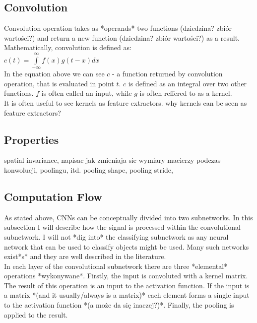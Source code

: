 \documentclass[a4paper,10pt]{report}
\begin{document}
      \subsection{Convolution} %
	Convolution operation takes as *operands* two functions (dziedzina? zbiór wartości?) and return a new function (dziedzina? zbiór wartości?) as a result. Mathematically, convolution is defined as: \\
	
	$c(t) = \int\limits_{-\infty}^\infty f(x)g(t-x)dx$ \\
	
	In the equation above we can see $c$ - a function returned by convolution operation, that is evaluated in point $t$. $c$ is defined as an integral over two other functions. $f$ is often called an input, while $g$ is often reffered to as a kernel.%
	  \\
	
	
	It is often useful to see kernels as feature extractors. 
	why kernels can be seen as feature extractors?

      \subsection{Properties} %
	spatial invariance, napisac jak zmieniaja sie wymiary macierzy podczas konwolucji, poolingu, itd. pooling shape, pooling stride,
      \subsection{Computation Flow} %
	As stated above, CNNs can be conceptually divided into two subnetworks. In this subsection I will describe how the signal is processed within the convolutional subnetwork. I will not *dig into* the classifying subnetwork as any neural network that can be used to classify objects might be used. Many such networks exist*s* and they are well described in the literature. \\ %
	
	In each layer of the convolutional subnetwork there are three *elemental* operations *wykonywane*. Firstly, the input is convoluted with a kernel matrix. The result of this operation is an input to the activation function. If the input is a matrix *(and it usually/always is a matrix)* each element forms a single input to the activation function *(a może da się inaczej?)*. Finally, the pooling is applied to the result. \\
	
\end{document}
